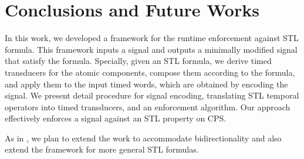 \section{Conclusions and Future Works}
\label{sec:Conclusions and Future Works}
In this work, we developed a framework for the runtime enforcement against STL formula. This framework inputs a signal and outputs a minimally modified signal that satisfy the formula. Specially, given an STL formula, we derive timed transducers for the atomic components, compose them according to the formula, and apply them to the input timed words, which are obtained by encoding the signal. We present detail procedure for signal encoding, translating STL temporal operators into timed transducers, and an enforcement algorithm. Our approach effectively enforces a signal against an STL property on CPS.

As in \cite{10.1145/3126500,10.1145/3092282.3092291,10.1109/TII.2019.2945520}, we plan to extend the work to accommodate bidirectionality and also extend the framework for more general STL formulas.





